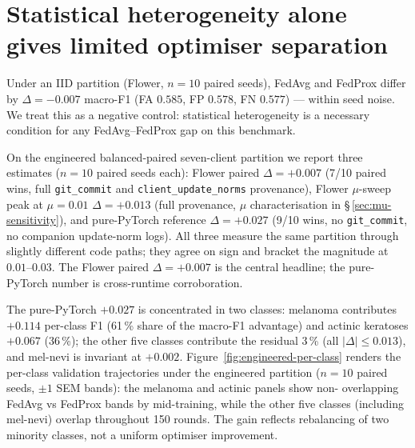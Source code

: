\documentclass[11pt,a4paper]{report}
\begin{document}


\section{Statistical heterogeneity alone gives limited optimiser separation}
\label{sec:statistical-heterogeneity}

Under an IID partition (Flower, $n=10$ paired seeds), FedAvg and FedProx
differ by $\Delta = -0.007$ macro-F1 (FA $0.585$, FP $0.578$, FN $0.577$) ---
within seed noise. We treat this as a negative control: statistical
heterogeneity is a necessary condition for any FedAvg--FedProx gap on this
benchmark.

On the engineered balanced-paired seven-client partition we report three
estimates ($n=10$ paired seeds each): Flower paired $\Delta = +0.007$ (7/10
paired wins, full \texttt{git\_commit} and \texttt{client\_update\_norms}
provenance), Flower $\mu$-sweep peak at $\mu = 0.01$ $\Delta = +0.013$ (full
provenance, $\mu$ characterisation in \S\,\ref{sec:mu-sensitivity}), and
pure-PyTorch reference $\Delta = +0.027$ (9/10 wins, no \texttt{git\_commit},
no companion update-norm logs). All three measure the same partition through
slightly different code paths; they agree on sign and bracket the magnitude
at $0.01$--$0.03$. The Flower paired $\Delta = +0.007$ is the central
headline; the pure-PyTorch number is cross-runtime corroboration.

The pure-PyTorch $+0.027$ is concentrated in two classes: melanoma
contributes $+0.114$ per-class F1 (61\,\% share of the macro-F1 advantage)
and actinic keratoses $+0.067$ (36\,\%); the other five classes contribute
the residual 3\,\% (all $|\Delta| \leq 0.013$), and mel-nevi is invariant at
$+0.002$. Figure~\ref{fig:engineered-per-class} renders the per-class
validation trajectories under the engineered partition ($n=10$ paired
seeds, $\pm 1$ SEM bands): the melanoma and actinic panels show non-
overlapping FedAvg vs FedProx bands by mid-training, while the other five
classes (including mel-nevi) overlap throughout 150 rounds. The gain
reflects rebalancing of two minority classes, not a uniform optimiser
improvement.
\end{document}
